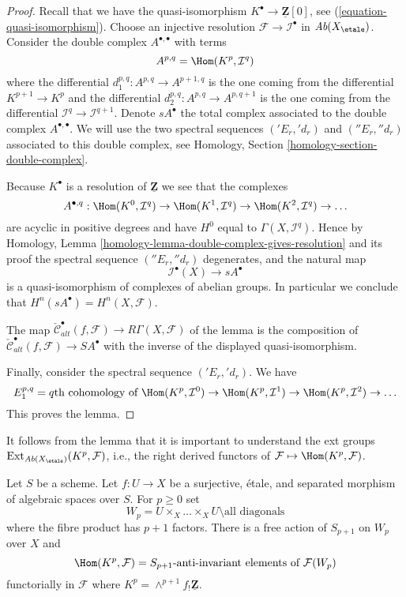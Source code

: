 \begin{proof}
Recall that we have the quasi-isomorphism
$K^\bullet \to \underline{\mathbf{Z}}[0]$, see
(\ref{equation-quasi-isomorphism}).
Choose an injective resolution $\mathcal{F} \to \mathcal{I}^\bullet$
in $\textit{Ab}(X_\etale)$. Consider the double complex
$A^{\bullet, \bullet}$ with terms
$$
A^{p, q} = \Hom(K^p, \mathcal{I}^q)
$$
where the differential $d_1^{p, q} : A^{p, q} \to A^{p + 1, q}$
is the one coming from the differential $K^{p + 1} \to K^p$
and the differential $d_2^{p, q} : A^{p, q} \to A^{p, q + 1}$ is the
one coming from the differential
$\mathcal{I}^q \to \mathcal{I}^{q + 1}$.
Denote $sA^\bullet$ the total complex associated to
the double complex $A^{\bullet, \bullet}$.
We will use the two spectral
sequences $({}'E_r, {}'d_r)$ and $({}''E_r, {}''d_r)$
associated to this double complex, see
Homology, Section \ref{homology-section-double-complex}.

\medskip\noindent
Because $K^\bullet$ is a resolution of $\underline{\mathbf{Z}}$
we see that the complexes
$$
A^{\bullet, q} :
\Hom(K^0, \mathcal{I}^q) \to
\Hom(K^1, \mathcal{I}^q) \to
\Hom(K^2, \mathcal{I}^q) \to \ldots
$$
are acyclic in positive degrees and have $H^0$ equal to
$\Gamma(X, \mathcal{I}^q)$. Hence by
Homology, Lemma \ref{homology-lemma-double-complex-gives-resolution}
and its proof the spectral sequence $({}''E_r, {}''d_r)$ degenerates,
and the natural map
$$
\mathcal{I}^\bullet(X) \longrightarrow sA^\bullet
$$
is a quasi-isomorphism of complexes of abelian groups. In particular
we conclude that $H^n(sA^\bullet) = H^n(X, \mathcal{F})$.

\medskip\noindent
The map $\check{\mathcal{C}}^\bullet_{alt}(f, \mathcal{F}) \to
R\Gamma(X, \mathcal{F})$ of the lemma is the composition of
$\check{\mathcal{C}}^\bullet_{alt}(f, \mathcal{F}) \to SA^\bullet$
with the inverse of the displayed quasi-isomorphism.

\medskip\noindent
Finally, consider the spectral sequence $({}'E_r, {}'d_r)$.
We have
$$
E_1^{p, q} = q\text{th cohomology of }
\Hom(K^p, \mathcal{I}^0) \to
\Hom(K^p, \mathcal{I}^1) \to
\Hom(K^p, \mathcal{I}^2) \to \ldots
$$
This proves the lemma.
\end{proof}

\noindent
It follows from the lemma that it is important to understand the
ext groups $\text{Ext}_{\textit{Ab}(X_\etale)}(K^p, \mathcal{F})$,
i.e., the right derived functors of
$\mathcal{F} \mapsto \Hom(K^p, \mathcal{F})$.

\begin{lemma}
\label{lemma-compute}
Let $S$ be a scheme. Let $f : U \to X$ be a surjective, \'etale, and separated
morphism of algebraic spaces over $S$. For $p \geq 0$ set
$$
W_p = U \times_X \ldots \times_X U \setminus \text{all diagonals}
$$
where the fibre product has $p + 1$ factors.
There is a free action of $S_{p + 1}$ on $W_p$ over $X$ and
$$
\Hom(K^p, \mathcal{F}) = S_{p + 1}\text{-anti-invariant elements of }
\mathcal{F}(W_p)
$$
functorially in $\mathcal{F}$ where
$K^p = \wedge^{p + 1}f_!\underline{\mathbf{Z}}$.
\end{lemma}


